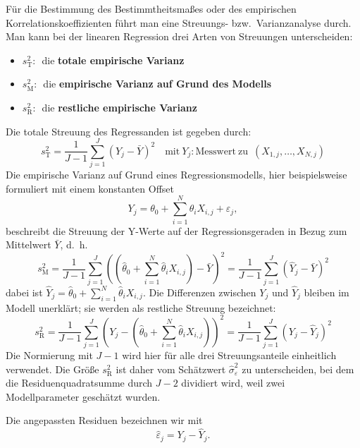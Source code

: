 F\"{u}r die Bestimmung des Bestimmtheitsma{\ss}es oder des
empirischen Korrelationskoeffizienten f\"{u}hrt man eine Streuungs-
bzw.\ Varianzanalyse durch. Man kann bei der linearen Regression drei
Arten von Streuungen unterscheiden:

\begin{itemize}
	\item[] $s_{\mathrm{T}}^2:$~die \textbf{totale empirische Varianz}
	\item[] $s_{\mathrm{M}}^2:$~die \textbf{empirische Varianz auf Grund des Modells}
	\item[] $s_{\mathrm{R}}^2:$~die \textbf{restliche empirische Varianz}
\end{itemize}

Die totale Streuung des Regressanden ist gegeben durch:
\begin{equation}
s_{\mathrm{T}}^2 = \frac{1}{J - 1}\sum\limits_{j = 1}^J {(Y_j - \bar {Y})^2}
\quad \mathrm{mit~} Y_j : \mathrm{Messwert ~zu~} \; (X_{1,j},\dots,X_{N,j})
\end{equation}
Die empirische Varianz auf Grund eines Regressionsmodells, hier beispielsweise formuliert mit einem konstanten Offset
$$
 Y_j =\theta_0+\sum_{i=1}^{N}\theta_i X_{i,j} + \varepsilon_j,
$$
beschreibt die
Streuung der Y-Werte auf der Regressionsgeraden in Bezug zum
Mittelwert $\bar{Y}$, d.~h.
\begin{equation}
s_{\mathrm{M}}^2 = \frac{1}{J - 1}\sum\limits_{j = 1}^J {\left((\hat{\theta}_0 + \sum_{i=1}^N \hat{\theta}_i X_{i,j}) - \bar{Y}\right)^2} = 
\frac{1}{J - 1}\sum\limits_{j = 1}^J {(\widehat Y_j - \bar{Y})^2}
\end{equation}
dabei ist $\widehat Y_j = \hat{\theta}_0 + \sum_{i=1}^N \hat{\theta}_i X_{i,j}$.
Die Differenzen zwischen $Y_j$ und $\widehat Y_j$ bleiben im
Modell unerkl\"{a}rt; sie werden als restliche Streuung bezeichnet:
\begin{equation}
s_{\mathrm{R}}^2 = \frac{1}{J - 1}\sum\limits_{j = 1}^J {\left(Y_j - (\hat{\theta}_0
	+ \sum_{i=1}^N \hat{\theta}_i X_{i,j} )\right)^2}
  = \frac{1}{J - 1}\sum\limits_{j = 1}^J {(Y_j - \widehat Y_j)^2}
\end{equation}
Die Normierung mit $J-1$ wird hier für alle drei
Streuungsanteile einheitlich verwendet. Die Größe
$s_{\mathrm R}^2$ ist daher vom Schätzwert
$\hat\sigma_\varepsilon^2$ zu unterscheiden, bei dem
die Residuenquadratsumme durch $J-2$ dividiert wird,
weil zwei Modellparameter geschätzt wurden.

Die angepassten Residuen bezeichnen wir mit
\begin{equation}
  \hat\varepsilon_j=Y_j-\widehat Y_j.
\end{equation}

